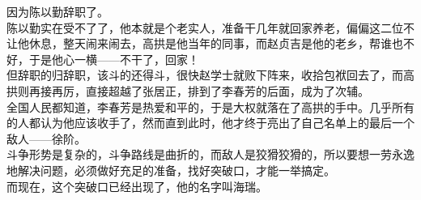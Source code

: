 \begin{multicols}{\theparacolNo}
因为陈以勤辞职了。\\

陈以勤实在受不了了，他本就是个老实人，准备干几年就回家养老，偏偏这二位不让他休息，整天闹来闹去，高拱是他当年的同事，而赵贞吉是他的老乡，帮谁也不好，于是他心一横——不干了，回家！\\

但辞职的归辞职，该斗的还得斗，很快赵学士就败下阵来，收拾包袱回去了，而高拱则再接再厉，直接超越了张居正，排到了李春芳的后面，成为了次辅。\\

全国人民都知道，李春芳是热爱和平的，于是大权就落在了高拱的手中。几乎所有的人都认为他应该收手了，然而直到此时，他才终于亮出了自己名单上的最后一个敌人——徐阶。\\

斗争形势是复杂的，斗争路线是曲折的，而敌人是狡猾狡猾的，所以要想一劳永逸地解决问题，必须做好充足的准备，找好突破口，才能一举搞定。\\

而现在，这个突破口已经出现了，他的名字叫海瑞。\\

\ifnum{}
	\end{multicols}
\fi
\newpage
